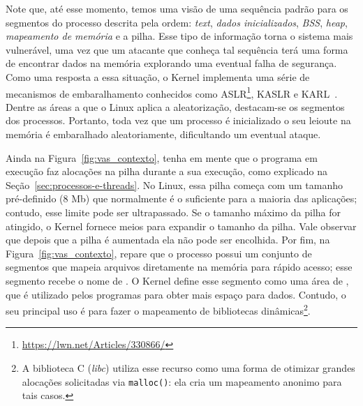 Note que, até esse momento, temos uma visão de uma sequência padrão para os
segmentos do processo descrita pela ordem: \emph{text}, \emph{dados
inicializados}, \emph{BSS}, \emph{heap}, \emph{mapeamento de memória} e
a pilha. Esse tipo de informação torna o sistema mais vulnerável, uma vez
que um atacante que conheça tal sequência terá uma forma de encontrar dados na
memória explorando uma eventual falha de segurança. Como uma resposta a essa situação,
o Kernel implementa uma série de mecanismos de embaralhamento
conhecidos como ASLR\footnote{\url{https://lwn.net/Articles/330866/}}, KASLR e
KARL~\citep{kaslr}. Dentre as áreas a que o Linux aplica a aleatorização,
destacam-se os segmentos dos processos. Portanto, toda vez que um processo é
inicializado o seu leioute na memória é embaralhado aleatoriamente, dificultando um eventual
ataque.

Ainda na Figura~\ref{fig:vas_contexto}, tenha em mente que o programa em
execução faz alocações na pilha durante a sua execução, como explicado
na Seção~\ref{sec:processos-e-threads}. No Linux, essa pilha começa
com um tamanho pré-definido (8 Mb) que normalmente é o suficiente para a
maioria das aplicações; contudo, esse limite pode ser ultrapassado. Se o
tamanho máximo da pilha for atingido, o Kernel fornece meios para
expandir o tamanho da pilha. Vale observar que depois que a
pilha é aumentada ela não pode ser encolhida. Por fim, na
Figura~\ref{fig:vas_contexto}, repare que o processo possui um conjunto de
segmentos que mapeia arquivos diretamente na memória para rápido acesso; esse
segmento recebe o nome de . O Kernel
define esse segmento como uma área de , que é
utilizado pelos programas para obter mais espaço para dados. Contudo, o seu
principal uso é para fazer o mapeamento de bibliotecas dinâmicas\footnote{A
biblioteca C (\textit{libc}) utiliza esse recurso como uma forma de otimizar
grandes alocações solicitadas via \texttt{malloc()}: ela cria um mapeamento
anonimo para tais casos.}.

